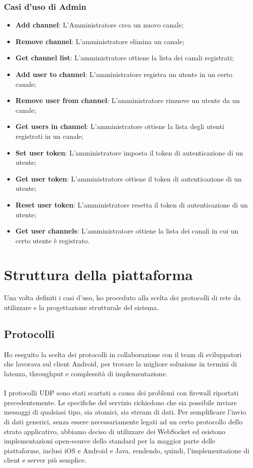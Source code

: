 		\subsubsection{Casi d'uso di Admin}
		\begin{itemize}
			\item \textbf{Add channel}: L'Amministratore crea un nuovo canale;
			\item \textbf{Remove channel}: L'amministratore elimina un canale;
			\item \textbf{Get channel list}: L'amministratore ottiene la lista dei canali registrati;
			\item \textbf{Add user to channel}: L'amministratore registra un utente in un certo canale;
			\item \textbf{Remove user from channel}: L'amministratore rimuove un utente da un canale;
			\item \textbf{Get users in channel}: L'amministratore ottiene la lista degli utenti registrati in un canale;
			\item \textbf{Set user token}: L'amministratore imposta il token di autenticazione di un utente;
			\item \textbf{Get user token}: L'amministratore ottiene il token di autenticazione di un utente;
			\item \textbf{Reset user token}: L'amministratore resetta il token di autenticazione di un utente;
			\item \textbf{Get user channels}: L'amministratore ottiene la lista dei canali in cui un certo utente è registrato.
		\end{itemize}
		

\section{Struttura della piattaforma}
Una volta definiti i casi d'uso, ho proceduto alla scelta dei protocolli di rete da utilizzare e la progettazione strutturale del sistema.
	\subsection{Protocolli}
	Ho eseguito la scelta dei protocolli in collaborazione con il team di sviluppatori che lavorava sul client Android, per trovare la migliore soluzione in termini di latenza, throughput e complessità di implementazione.
	\paragraph*{}
	I protocolli UDP sono stati scartati a causa dei problemi con firewall riportati precedentemente.
	Le specifiche del servizio richiedono che sia possibile inviare messaggi di qualsiasi tipo, sia atomici, sia stream di dati. Per semplificare l'invio di dati generici, senza essere necessariamente legati ad un certo protocollo dello strato applicativo, abbiamo deciso di utilizzare dei WebSocket ed esistono implementazioni open-source dello standard per la maggior parte delle piattaforme, inclusi iOS e Android e Java, rendendo, quindi, l'implementazione di client e server più semplice.
	
